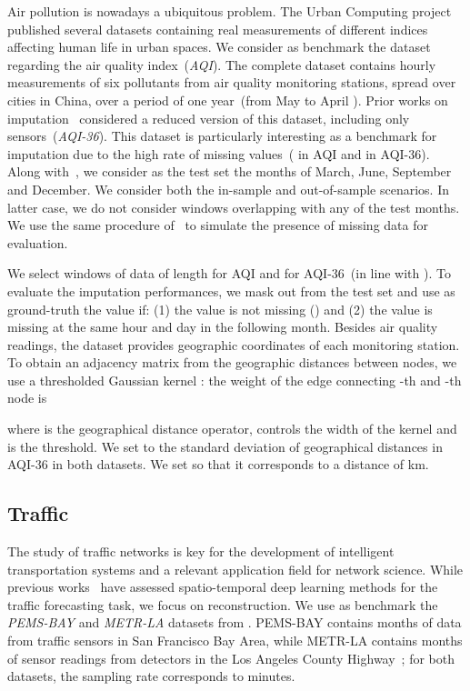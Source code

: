 \documentclass{article} \usepackage{iclr2022_conference,times}
\begin{document}
Air pollution is nowadays a ubiquitous problem. The Urban Computing project~\citep{zheng2014urban, zheng2015forecasting} published several datasets containing real measurements of different indices affecting human life in urban spaces. We consider as benchmark the dataset regarding the air quality index~(\emph{AQI}). The complete dataset contains hourly measurements of six pollutants from  air quality monitoring stations, spread over  cities in China, over a period of one year~(from May  to April ). Prior works on imputation~\citep{yi2016stmvl, cao2018brits} considered a reduced version of this dataset, including only  sensors~(\emph{AQI-36}). This dataset is particularly interesting as a benchmark for imputation due to the high rate of missing values~( in AQI and  in AQI-36). Along with~\citet{yi2016stmvl}, we consider as the test set the months of March, June, September and December. We consider both the in-sample and out-of-sample scenarios. In latter case, we do not consider windows overlapping with any of the test months. We use the same procedure of~\citet{yi2016stmvl} to simulate the presence of missing data for evaluation.

We select windows of data of length  for AQI and  for AQI-36~(in line with \citet{cao2018brits}). To evaluate the imputation performances, we mask out from the test set and use as ground-truth the value  if: (1) the value is not missing () and (2) the value is missing at the same hour and day in the following month.
Besides air quality readings, the dataset provides geographic coordinates of each monitoring station. To obtain an adjacency matrix from the geographic distances between nodes, we use a thresholded Gaussian kernel \citep{shuman2013emerging}: the weight  of the edge connecting -th and -th node is

where  is the geographical distance operator,  controls the width of the kernel and  is the threshold. We set  to the standard deviation of geographical distances in AQI-36 in both datasets. We set  so that it corresponds to a distance of  km.

\subsection{Traffic}

The study of traffic networks is key for the development of intelligent transportation systems and a relevant application field for network science. While previous works~\citep{yu2017spatio, li2018diffusion, wu2019graph, shang2020discrete} have assessed spatio-temporal deep learning methods for the traffic forecasting task, we focus on reconstruction. We use as benchmark the \emph{PEMS-BAY} and \emph{METR-LA} datasets from \citet{li2018diffusion}. PEMS-BAY contains  months of data from  traffic sensors in San Francisco Bay Area, while METR-LA contains  months of sensor readings from  detectors in the Los Angeles County Highway~\citep{jagadish2014big}; for both datasets, the sampling rate corresponds to  minutes.
\end{document}
